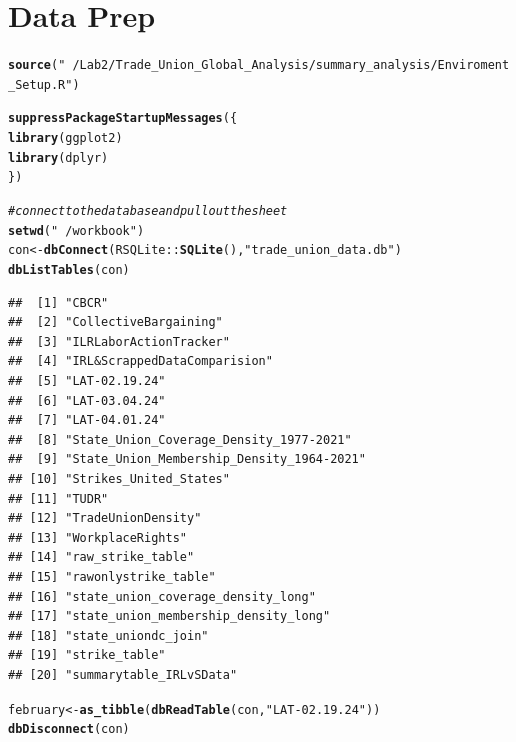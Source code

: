 \documentclass[11pt]{article}\usepackage[]{graphicx}\usepackage[]{xcolor}
\makeatletter
\newcommand{\hlstr}[1]{\textcolor[rgb]{0.192,0.494,0.8}{#1}}%
\newcommand{\hlcom}[1]{\textcolor[rgb]{0.678,0.584,0.686}{\textit{#1}}}%
\newcommand{\hlopt}[1]{\textcolor[rgb]{0,0,0}{#1}}%
\newcommand{\hlstd}[1]{\textcolor[rgb]{0.345,0.345,0.345}{#1}}%
\newcommand{\hlkwb}[1]{\textcolor[rgb]{0.69,0.353,0.396}{#1}}%
\newcommand{\hlkwd}[1]{\textcolor[rgb]{0.737,0.353,0.396}{\textbf{#1}}}%
\newenvironment{kframe}{%
 \def\at@end@of@kframe{}%
 \ifinner\ifhmode%
  \def\at@end@of@kframe{\end{minipage}}%
  \begin{minipage}{\columnwidth}%
 \fi\fi%
 \def\FrameCommand##1{\hskip\@totalleftmargin \hskip-\fboxsep
 \colorbox{shadecolor}{##1}\hskip-\fboxsep
     \hskip-\linewidth \hskip-\@totalleftmargin \hskip\columnwidth}%
 \MakeFramed {\advance\hsize-\width
   \@totalleftmargin\z@ \linewidth\hsize
   \@setminipage}}%
 {\par\unskip\endMakeFramed%
 \at@end@of@kframe}
\newenvironment{knitrout}{}{} %
\makeatother
\begin{document}
\section{Data Prep}
\begin{knitrout}
\color{fgcolor}\begin{kframe}
\begin{alltt}
\hlkwd{source}\hlstd{(}\hlstr{"~/Lab2/Trade_Union_Global_Analysis/summary_analysis/Enviroment_Setup.R"}\hlstd{)}

\hlkwd{suppressPackageStartupMessages}\hlstd{(\{}
  \hlkwd{library}\hlstd{(ggplot2)}
  \hlkwd{library}\hlstd{(dplyr)}
\hlstd{\})}

\hlcom{# connect to the database and pull out the sheet}
\hlkwd{setwd}\hlstd{(}\hlstr{"~/workbook"}\hlstd{)}
\hlstd{con} \hlkwb{<-} \hlkwd{dbConnect}\hlstd{(RSQLite}\hlopt{::}\hlkwd{SQLite}\hlstd{(),} \hlstr{"trade_union_data.db"}\hlstd{)}
\hlkwd{dbListTables}\hlstd{(con)}
\end{alltt}
\begin{verbatim}
##  [1] "CBCR"                                    
##  [2] "CollectiveBargaining"                    
##  [3] "ILRLaborActionTracker"                   
##  [4] "IRL&ScrappedDataComparision"             
##  [5] "LAT-02.19.24"                            
##  [6] "LAT-03.04.24"                            
##  [7] "LAT-04.01.24"                            
##  [8] "State_Union_Coverage_Density_1977-2021"  
##  [9] "State_Union_Membership_Density_1964-2021"
## [10] "Strikes_United_States"                   
## [11] "TUDR"                                    
## [12] "TradeUnionDensity"                       
## [13] "WorkplaceRights"                         
## [14] "raw_strike_table"                        
## [15] "rawonlystrike_table"                     
## [16] "state_union_coverage_density_long"       
## [17] "state_union_membership_density_long"     
## [18] "state_uniondc_join"                      
## [19] "strike_table"                            
## [20] "summarytable_IRLvSData"
\end{verbatim}
\begin{alltt}
\hlstd{february} \hlkwb{<-} \hlkwd{as_tibble}\hlstd{(}\hlkwd{dbReadTable}\hlstd{(con,} \hlstr{"LAT-02.19.24"}\hlstd{))}
\hlkwd{dbDisconnect}\hlstd{(con)}
\end{alltt}
\end{kframe}
\end{knitrout}
\end{document}
